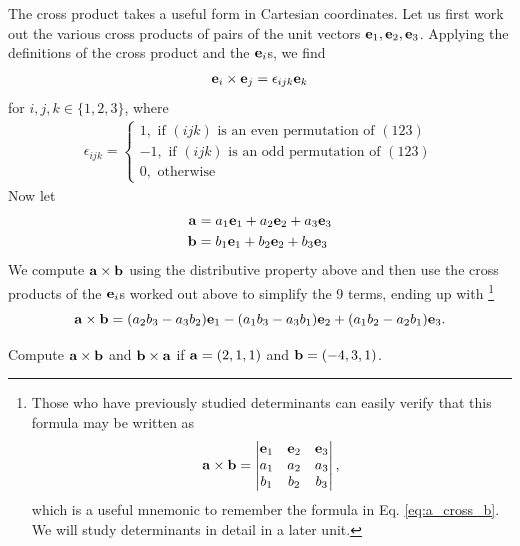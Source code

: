 \documentclass[12pt,letterpaper,reqno]{article}
\numberwithin{equation}{section}
\newcommand{\fixme}[1]{{\color{orange}{[#1]}}}
\begin{document}
The cross product takes a useful form in  Cartesian coordinates. Let us first work out the various cross products of pairs of the unit vectors ${\bf e}_1, {\bf e}_2, {\bf e}_3$. Applying the definitions of the cross product and the ${\bf e}_i$s, we find 
\begin{align*}
	{\bf e}_i \times {\bf e}_j=\epsilon_{ijk}{\bf e}_k
\end{align*}
for $i,j,k \in \{1,2,3\}$, where
\begin{align*}
	\epsilon_{ijk}=\begin{cases}
		1, \text{ if $(ijk)$ is an even permutation of $(123)$} \\
		-1, \text{ if $(ijk)$ is an odd permutation of $(123)$} \\
		0, \text{ otherwise}
	\end{cases}
\end{align*}
Now let
\begin{align*}
	{\bf a}&=a_1{\bf e}_1+a_2{\bf e}_2+a_3{\bf e}_3 \\
	{\bf b}&=b_1{\bf e}_1+b_2{\bf e}_2+b_3{\bf e}_3 \\
\end{align*} 
We compute ${\bf a} \times {\bf b}$ using the distributive property above and then use the cross products of the ${\bf e}_i$s worked out above to simplify the 9 terms, ending up with \footnote{Those who have previously studied determinants can easily verify that this formula may be written as  
\begin{align*}
	{\bf a} \times {\bf b}=\begin{vmatrix}
		{\bf e}_1 & {\bf e}_2 & {\bf e}_3 \\
		a_1 & a_2 & a_3 \\
		b_1 & b_2 & b_3
	\end{vmatrix},
\end{align*} which is a useful mnemonic to remember the formula in Eq. \eqref{eq:a_cross_b}. We will study determinants in detail in a later unit.}
\begin{equation}\label{eq:a_cross_b}
	{\bf a} \times {\bf b}=(a_2b_3-a_3b_2){\bf e}_1-(a_1b_3-a_3b_1){\bf e}_2+(a_1b_2-a_2b_1){\bf e}_3.
\end{equation}
\fixme{Discuss even odd permutations of $(123)$ and how to remember the signs.}

\begin{exercise}
Compute ${\bf a} \times {\bf b}$ and ${\bf b} \times {\bf a}$ if ${\bf a}=(2,1,1)$ and ${\bf b}=(-4,3,1)$.	
\end{exercise}
\end{document}
